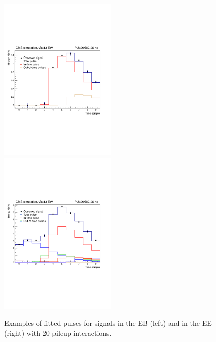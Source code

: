\documentclass[thesis.tex]{subfiles}
\begin{document}
\begin{figure}[hbtp]
	\includegraphics[width=0.5\textwidth]{plot/multifit_EB.pdf}
	\includegraphics[width=0.5\textwidth]{plot/multifit_EE.pdf}
	\caption{Examples of fitted pulses for signals in the EB (left) and in the EE (right) with 20 pileup interactions.}
	\label{fig:multifit}
\end{figure}
\end{document}
